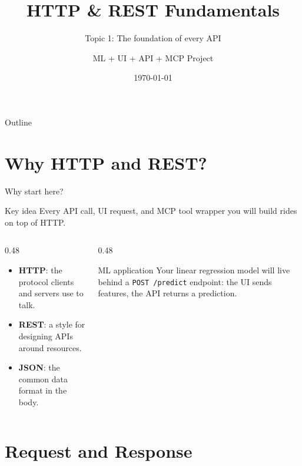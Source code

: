\documentclass[aspectratio=169,10pt]{beamer}
\title[HTTP \& REST]{HTTP \& REST Fundamentals}
\subtitle{Topic 1: The foundation of every API}
\author{ML + UI + API + MCP Project}
\institute{Learning Path}
\date{\today}
\begin{document}
\begin{frame}
\titlepage
\end{frame}

\begin{frame}{Outline}
\tableofcontents
\end{frame}

\section{Why HTTP and REST?}

\begin{frame}{Why start here?}
\begin{block}{Key idea}
Every API call, UI request, and MCP tool wrapper you will build rides on top of HTTP.
\end{block}
\begin{columns}[T]
\begin{column}{0.48\textwidth}
\begin{itemize}
\item \textbf{HTTP}: the protocol clients and servers use to talk.
\item \textbf{REST}: a style for designing APIs around resources.
\item \textbf{JSON}: the common data format in the body.
\end{itemize}
\end{column}
\begin{column}{0.48\textwidth}
\begin{alertblock}{ML application}
Your linear regression model will live behind a \texttt{POST /predict} endpoint: the UI sends features, the API returns a prediction.
\end{alertblock}
\end{column}
\end{columns}
\end{frame}

\section{Request and Response}
\end{document}
